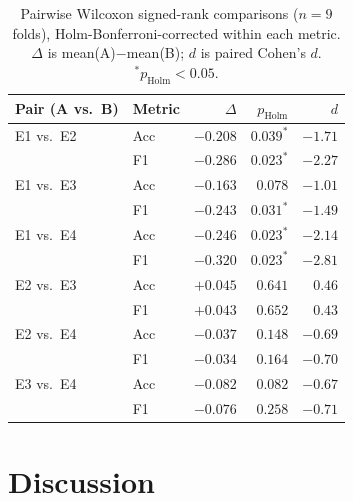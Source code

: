 \documentclass[conference]{IEEEtran}
\begin{document}
\begin{table}[t]
\centering
\small
\caption{Pairwise Wilcoxon signed-rank comparisons ($n=9$ folds),
Holm-Bonferroni-corrected within each metric. $\Delta$ is
mean(A)$-$mean(B); $d$ is paired Cohen's $d$. $^{*}p_{\text{Holm}}<0.05$.}
\label{tab:statistical-comparisons}
\begin{tabular}{llrrr}
\toprule
Pair (A vs.\ B) & Metric & $\Delta$ & $p_{\text{Holm}}$ & $d$ \\
\midrule
E1 vs.\ E2 & Acc & $-0.208$ & $0.039^{*}$ & $-1.71$ \\
           & F1  & $-0.286$ & $0.023^{*}$ & $-2.27$ \\
E1 vs.\ E3 & Acc & $-0.163$ & $0.078$      & $-1.01$ \\
           & F1  & $-0.243$ & $0.031^{*}$ & $-1.49$ \\
E1 vs.\ E4 & Acc & $-0.246$ & $0.023^{*}$ & $-2.14$ \\
           & F1  & $-0.320$ & $0.023^{*}$ & $-2.81$ \\
E2 vs.\ E3 & Acc & $+0.045$ & $0.641$      & $0.46$ \\
           & F1  & $+0.043$ & $0.652$      & $0.43$ \\
E2 vs.\ E4 & Acc & $-0.037$ & $0.148$      & $-0.69$ \\
           & F1  & $-0.034$ & $0.164$      & $-0.70$ \\
E3 vs.\ E4 & Acc & $-0.082$ & $0.082$      & $-0.67$ \\
           & F1  & $-0.076$ & $0.258$      & $-0.71$ \\
\bottomrule
\end{tabular}
\end{table}

\section{Discussion}
\label{sec:discussion}
\end{document}
